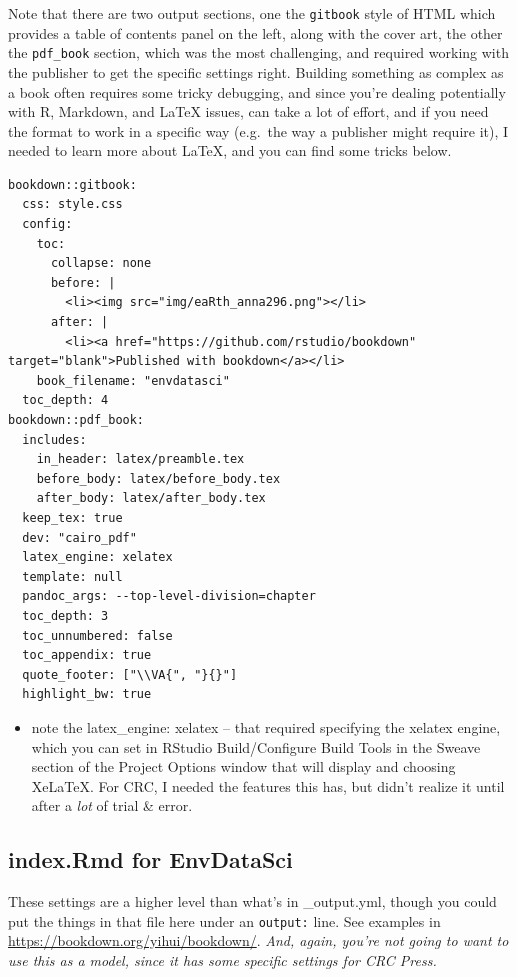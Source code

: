 \documentclass[
]{book}
\providecommand{\tightlist}{%
  \setlength{\itemsep}{0pt}\setlength{\parskip}{0pt}}
\begin{document}
Note that there are two output sections, one the \texttt{gitbook} style of HTML which provides a table of contents panel on the left, along with the cover art, the other the \texttt{pdf\_book} section, which was the most challenging, and required working with the publisher to get the specific settings right. Building something as complex as a book often requires some tricky debugging, and since you're dealing potentially with R, Markdown, and LaTeX issues, can take a lot of effort, and if you need the format to work in a specific way (e.g.~the way a publisher might require it), I needed to learn more about LaTeX, and you can find some tricks below.

\begin{verbatim}
bookdown::gitbook:
  css: style.css
  config:
    toc:
      collapse: none
      before: |
        <li><img src="img/eaRth_anna296.png"></li>
      after: |
        <li><a href="https://github.com/rstudio/bookdown" target="blank">Published with bookdown</a></li>
    book_filename: "envdatasci"
  toc_depth: 4
bookdown::pdf_book:
  includes:
    in_header: latex/preamble.tex
    before_body: latex/before_body.tex
    after_body: latex/after_body.tex
  keep_tex: true
  dev: "cairo_pdf"
  latex_engine: xelatex
  template: null
  pandoc_args: --top-level-division=chapter
  toc_depth: 3
  toc_unnumbered: false
  toc_appendix: true
  quote_footer: ["\\VA{", "}{}"]
  highlight_bw: true
\end{verbatim}

\begin{itemize}
\tightlist
\item
  note the latex\_engine: xelatex -- that required specifying the xelatex engine, which you can set in RStudio Build/Configure Build Tools in the Sweave section of the Project Options window that will display and choosing XeLaTeX. For CRC, I needed the features this has, but didn't realize it until after a \emph{lot} of trial \& error.
\end{itemize}

\hypertarget{index.rmd-for-envdatasci}{%
\subsection{index.Rmd for EnvDataSci}\label{index.rmd-for-envdatasci}}

These settings are a higher level than what's in \_output.yml, though you could put the things in that file here under an \texttt{output:} line. See examples in \url{https://bookdown.org/yihui/bookdown/}. \emph{And, again, you're not going to want to use this as a model, since it has some specific settings for CRC Press.}
\end{document}
